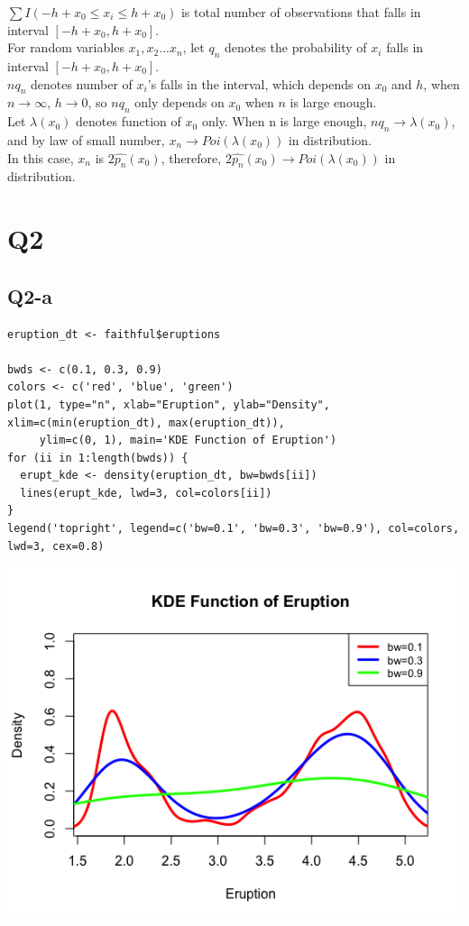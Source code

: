 \documentclass[12pt,letterpaper]{article}
\let\hat\widehat
\begin{document}
\noindent $\sum I(-h + x_0 \leq x_i \leq h + x_0)$ is total number of observations that falls in interval $[-h + x_0 , h + x_0]$. \\

\noindent For random variables $x_1, x_2 ... x_n$, let $q_n$ denotes the probability of $x_i$ falls in interval $[-h + x_0 , h + x_0]$. \\

\noindent $nq_n$ denotes number of $x_i$'s falls in the interval, which depends on $x_0$ and $h$, when $n \rightarrow \infty$, $h \rightarrow 0$, so $nq_n$ only depends on $x_0$ when $n$ is large enough. \\

\noindent Let $\lambda(x_0)$ denotes function of $x_0$ only. When n is large enough, $nq_n \rightarrow \lambda(x_0)$, and by law of small number, $x_n \rightarrow Poi(\lambda(x_0))$ in distribution. \\

\noindent In this case, $x_n$ is $2 \hat{p_n}(x_0)$, therefore, $2 \hat{p_n}(x_0) \rightarrow Poi(\lambda(x_0))$ in distribution. 

\newpage
\section*{Q2}
\subsection*{Q2-a}
\begin{verbatim}
eruption_dt <- faithful$eruptions

bwds <- c(0.1, 0.3, 0.9)
colors <- c('red', 'blue', 'green')
plot(1, type="n", xlab="Eruption", ylab="Density", xlim=c(min(eruption_dt), max(eruption_dt)),
     ylim=c(0, 1), main='KDE Function of Eruption')
for (ii in 1:length(bwds)) {
  erupt_kde <- density(eruption_dt, bw=bwds[ii])
  lines(erupt_kde, lwd=3, col=colors[ii])
}
legend('topright', legend=c('bw=0.1', 'bw=0.3', 'bw=0.9'), col=colors, lwd=3, cex=0.8)
\end{verbatim}

\includegraphics[scale=0.7]{q2-a.png}
\end{document}
